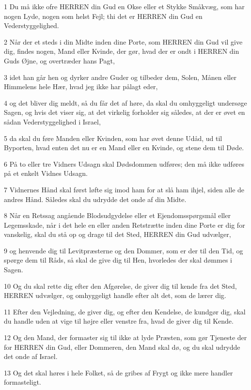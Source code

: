 \par 1 Du må ikke ofre HERREN din Gud en Okse eller et Stykke Småkvæg, som har nogen Lyde, nogen som helst Fejl; thi det er HERREN din Gud en Vederstyggelighed.
\par 2 Når der et steds i din Midte inden dine Porte, som HERREN din Gud vil give dig, findes nogen, Mand eller Kvinde, der gør, hvad der er ondt i HERREN din Guds Øjne, og overtræder hans Pagt,
\par 3 idet han går hen og dyrker andre Guder og tilbeder dem, Solen, Månen eller Himmelens hele Hær, hvad jeg ikke har pålagt eder,
\par 4 og det bliver dig meldt, så du får det af høre, da skal du omhyggeligt undersøge Sagen, og hvis det viser sig, at det virkelig forholder sig således, at der er øvet en sådan Vederstyggelighed i Israel,
\par 5 da skal du føre Manden eller Kvinden, som har øvet denne Udåd, ud til Byporten, hvad enten det nu er en Mand eller en Kvinde, og stene dem til Døde.
\par 6 På to eller tre Vidners Udsagn skal Dødsdommen udføres; den må ikke udføres på et enkelt Vidnes Udsagn.
\par 7 Vidnernes Hånd skal først løfte sig imod ham for at slå ham ihjel, siden alle de andres Hånd. Således skal du udrydde det onde af din Midte.
\par 8 Når en Retssag angående Blodsudgydelse eller et Ejendomsspørgsmål eller Legemsskade, når i det hele en eller anden Retstrætte inden dine Porte er dig for vanskelig, skal du stå op og drage til det Sted, HERREN din Gud udvælger,
\par 9 og henvende dig til Levitpræsterne og den Dommer, som er der til den Tid, og spørge dem til Råds, så skal de give dig til Hen, hvorledes der skal dømmes i Sagen.
\par 10 Og du skal rette dig efter den Afgørelse, de giver dig til kende fra det Sted, HERREN udvælger, og omhyggeligt handle efter alt det, som de lærer dig.
\par 11 Efter den Vejledning, de giver dig, og efter den Kendelse, de kundgør dig, skal du handle uden at vige til højre eller venstre fra, hvad de giver dig til Kende.
\par 12 Og den Mand, der formaster sig til ikke at lyde Præsten, som gør Tjeneste der for HERREN din Gud, eller Dommeren, den Mand skal dø, og du skal udrydde det onde af Israel.
\par 13 Og det skal høres i hele Folket, så de gribes af Frygt og ikke mere handler formasteligt.
